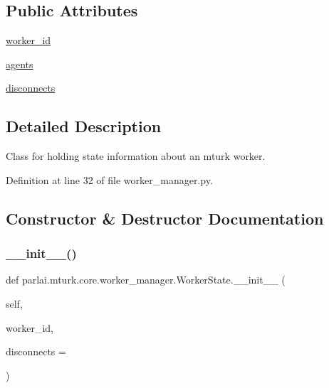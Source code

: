 \subsection*{Public Attributes}
\begin{DoxyCompactItemize}
\item 
\hyperlink{classparlai_1_1mturk_1_1core_1_1worker__manager_1_1WorkerState_a5cb2de9dfc1d8d0b07f693a9e6fabe72}{worker\+\_\+id}
\item 
\hyperlink{classparlai_1_1mturk_1_1core_1_1worker__manager_1_1WorkerState_a53912abee55c0bd1caaf5575c001d575}{agents}
\item 
\hyperlink{classparlai_1_1mturk_1_1core_1_1worker__manager_1_1WorkerState_ab751a2c9f79305a2db1439cd9449006a}{disconnects}
\end{DoxyCompactItemize}


\subsection{Detailed Description}
\begin{DoxyVerb}Class for holding state information about an mturk worker.
\end{DoxyVerb}
 

Definition at line 32 of file worker\+\_\+manager.\+py.



\subsection{Constructor \& Destructor Documentation}
\mbox{\label{classparlai_1_1mturk_1_1core_1_1worker__manager_1_1WorkerState_a93ec8410562403157cbf3ac4199761ac}} 
\subsubsection{\texorpdfstring{\+\_\+\+\_\+init\+\_\+\+\_\+()}{\_\_init\_\_()}}
{\footnotesize\ttfamily def parlai.\+mturk.\+core.\+worker\+\_\+manager.\+Worker\+State.\+\_\+\+\_\+init\+\_\+\+\_\+ (\begin{DoxyParamCaption}\item[{}]{self,  }\item[{}]{worker\+\_\+id,  }\item[{}]{disconnects = {} }\end{DoxyParamCaption})}

